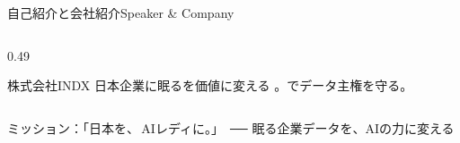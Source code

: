 \begin{frame}{自己紹介と会社紹介}{Speaker \& Company}
\begin{columns}[T]
\begin{column}{0.49\textwidth}
\begin{keytake}{株式会社INDX}
        \vskip1mm
        日本企業に眠るを価値に変える
        。でデータ主権を守る。
      \end{keytake}
    \end{column}
  \end{columns}
  \vfill
  \begin{tcolorbox}[enhanced,colback=brandaccent!92!black,coltext=white,boxrule=0pt,
    arc=1mm,left=3mm,right=3mm,top=1mm,bottom=1mm,halign=center,
    fontupper=\bfseries\sffamily\footnotesize]
    ミッション：「日本を、\,AIレディに。」\ ── 眠る企業データを、AIの力に変える
  \end{tcolorbox}
\end{frame}
